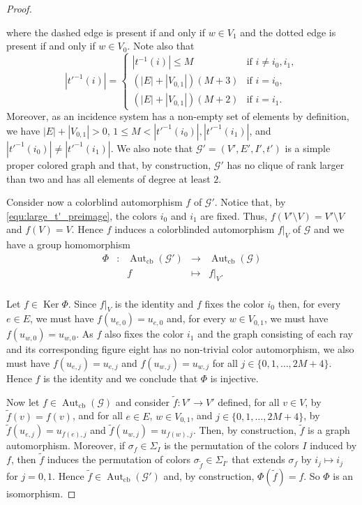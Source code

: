 \documentclass{amsart}
\theoremstyle{definition}
\theoremstyle{remark}
\newcommand{\Aut}{\operatorname{Aut}}
\newcommand{\Autcb}{\Aut_{\text{cb}}}
\newcommand{\Ker}{\operatorname{Ker}}
\newcommand{\G}{\mathcal{G}}
\begin{document}
\begin{proof}
\begin{center}
\end{center}
where the dashed edge is present if and only if $w\in V_1$ and the dotted edge is present if and only if $w\in V_0$. Note also that
\begin{equation}\label{equ:large_t'_preimage}
 |t'^{-1}(i)|=\begin{cases} |t^{-1}(i)|\leq M &\text{if $i\neq i_0,i_1$},\\
(|E|+|V_{0,1}|)(M+3)&\text{if $i=i_0$},\\
(|E|+|V_{0,1}|)(M+2)&\text{if $i=i_1$}.
\end{cases}
\end{equation}
Moreover, as an incidence system has a non-empty set of elements by definition, we have $|E|+|V_{0,1}|>0$, $1\leq M<|t'^{-1}(i_0)|,|t'^{-1}(i_1)|$, and $|t'^{-1}(i_0)|\neq |t'^{-1}(i_1)|$. We also note that $\mathcal{G}'=(V',E',I',t')$ is a simple proper colored graph and that, by construction, $\mathcal{G}'$ has no clique of rank larger than two and has all elements of degree at least $2$.

Consider now a colorblind automorphism $f$ of $\mathcal{G}'$. Notice that, by \eqref{equ:large_t'_preimage}, the colors $i_0$ and $i_1$ are fixed. Thus, $f(V'\setminus V)=V'\setminus V$ and $f(V)=V$. Hence $f$ induces a colorblinded automorphism $f|_V$ of $\mathcal{G}$ and we have a group homomorphism
\[\begin{array}{ccccc}
\Phi & : & \Autcb(\G') & \to & \Autcb(\G) \\
 & & f & \mapsto & f|_V. \\
\end{array}\]

Let $f\in \Ker \Phi$. Since $f|_V$ is the identity and $f$ fixes the color $i_0$ then, for every $e\in E$, we must have $f(u_{e,0})=u_{e,0}$ and, for every $w\in V_{0,1}$, we must have $f(u_{w,0})=u_{w,0}$. As $f$ also fixes the color $i_1$ and the graph consisting of each ray and its corresponding figure eight has no non-trivial color automorphism, we also must have $f(u_{e,j})=u_{e,j}$ and $f(u_{w,j})=u_{w,j}$ for all $j\in\{0,1,\dots,2M+4\}$. Hence $f$ is the identity and we conclude that $\Phi$ is injective. 

Now let $f\in\Autcb(\mathcal{G})$ and consider $\widetilde{f}\colon V'\to V'$ defined, for all $v\in V$, by $\widetilde{f}(v)=f(v)$, and for all $e\in E$, $w\in V_{0,1}$, and $j\in\{0,1,\dots,2M+4\}$, by $\widetilde{f}(u_{e,j})=u_{f(e),j}$ and $\widetilde{f}(u_{w,j})=u_{f(w),j}$. Then, by construction, $\widetilde{f}$ is a graph automorphism. Moreover, if $\sigma_f\in \Sigma_I$ is the permutation of the colors $I$ induced by $f$, then $\widetilde{f}$ induces the permutation of colors $\sigma_{\widetilde{f}}\in \Sigma_{I'}$ that extends $\sigma_f$ by $i_j\mapsto i_j$ for $j=0,1$. Hence $\widetilde{f}\in\Autcb(\mathcal{G}')$ and, by construction, $\Phi(\widetilde{f})=f$. So $\Phi$ is an isomorphism. 


\end{proof}
\end{document}
